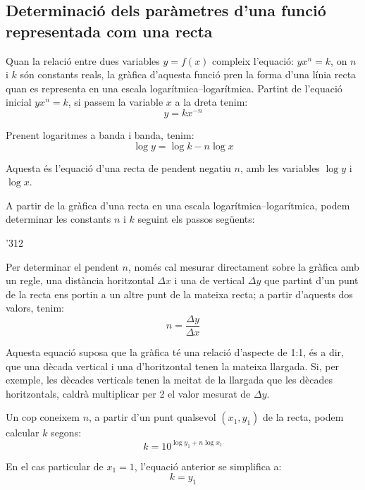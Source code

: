 \subsection{Determinació dels paràmetres d'una funció representada com una recta}

Quan la relació entre dues variables $y=f(x)$ compleix l'equació: $y x^n = k$, on $n$ i $k$  són constants  reals, la gràfica d'aquesta funció pren la forma d'una línia recta quan es representa en una escala logarítmica--logarítmica. Partint de l'equació inicial $y x^n = k$, si passem la variable $x$ a la dreta tenim:
\begin{equation}
  y = k x^{-n}
\end{equation}

Prenent logaritmes a banda i banda, tenim:
\begin{equation}
  \log y = \log k - n \log x
\end{equation}

Aquesta és l'equació d'una recta de pendent negatiu $n$, amb les variables $\log y$ i $\log x$.

A partir de la gràfica d'una recta en una escala logarítmica--logarítmica, podem determinar les constants $n$ i $k$ seguint els passos següents:

\begin{dingautolist}{'312}
    \item Per determinar el pendent $n$, només cal mesurar directament sobre la gràfica amb un regle, una distància horitzontal $\Delta{}x$ i una de vertical $\Delta{}y$ que partint d'un punt de la recta ens portin a un altre punt de la mateixa recta; a partir d'aquests dos valors, tenim:
        \begin{equation}
          n = \frac{\Delta{}y}{\Delta{}x}
        \end{equation}

        Aquesta equació suposa que la gràfica té una relació d'aspecte de 1:1, és a dir, que una dècada vertical i una d'horitzontal tenen la mateixa llargada. Si, per exemple, les dècades verticals tenen la meitat de la llargada que les dècades  horitzontals, caldrà multiplicar per 2 el valor mesurat de $\Delta{}y$.

   \item  Un cop  coneixem $n$, a partir d'un punt qualsevol $(x_1, y_1)$ de la recta, podem calcular $k$ segons:
        \begin{equation}
          k = 10^{\log y_1 + n \log x_1}
        \end{equation}

        En el cas particular de $x_1=1$, l'equació anterior se simplifica a:\begin{equation}
           k = y_1
        \end{equation}
\end{dingautolist}

